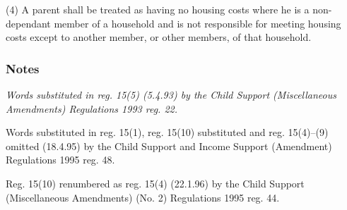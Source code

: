 \documentclass[a4paper]{article}
\newcommand\amendment[1]{\subsubsection*{Notes}{\itshape\frenchspacing\footnotesize #1 \par\goodbreak}}
\begin{document}
%
%
%
%
%


%

(4) 
A parent shall be treated as having no housing costs where he is a non-dependant member of a household and is not responsible for meeting housing costs except to another member, or other members, of that household.

\amendment{
Words substituted in reg. 15(5) (5.4.93) by the Child Support (Miscellaneous Amendments) Regulations 1993 reg. 22.

Words substituted in reg. 15(1), reg. 15(10) substituted and reg. 15(4)--(9) omitted (18.4.95) by the Child Support and Income Support (Amendment) Regulations 1995 reg. 48.

Reg. 15(10) renumbered as reg. 15(4) (22.1.96) by the Child Support (Miscellaneous Amendments) (No. 2) Regulations 1995 reg. 44.
}
\end{document}
